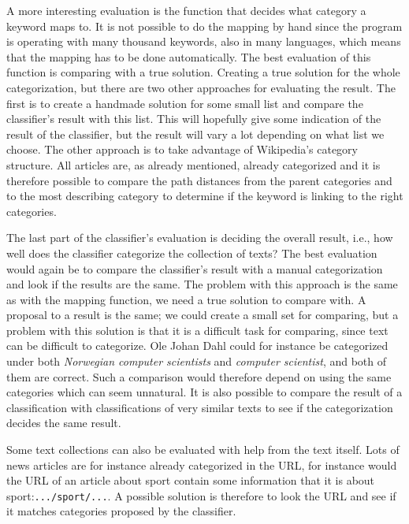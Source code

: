 \documentclass[english,a4paper]{ifimaster}
\begin{document}
A more interesting evaluation is the function that decides what category a keyword maps to. It is not possible to do the mapping by hand since the program is operating with many thousand keywords, also in many languages, which means that the mapping has to be done automatically. The best evaluation of this function is comparing with  a true solution. Creating a true solution for the whole categorization, but there are two other approaches for evaluating the result. The first is to create a handmade solution for some small list and compare the classifier's result with this list. This will hopefully give some indication of the result of the classifier, but the result will vary a lot depending on what list we choose. 
The other approach is to take advantage of Wikipedia's category structure. 
%
All articles are, as already mentioned, already categorized and it is therefore possible to compare the path 
distances from the parent categories and to the most describing category to determine if the keyword is linking to the right categories.


The last part of the classifier's evaluation is deciding the overall result, i.e., how well does the classifier categorize the collection of texts? The best evaluation would again be to compare the classifier's result with a manual categorization and look if the results are the same. The problem with this approach is the same as with the mapping function, we need a true solution to compare with. A proposal to a result is the same; we could create a small set for comparing, but a problem with this solution is that it is a difficult task for comparing, since text can be difficult to categorize. Ole Johan Dahl could for instance be categorized under both \textit{Norwegian computer scientists} and \textit{computer scientist}, and both of them are correct. Such a comparison would therefore depend on using the same categories which can seem unnatural. It is also possible to compare the result of a classification with classifications of very similar texts to see if the categorization decides the same result. 

Some text collections can also be evaluated with help from the text itself. Lots of news articles are for instance already categorized in the URL, for instance would the URL of an article about sport contain  some information that it is about sport:\texttt{.../sport/...}. A possible solution is therefore to look the URL and see if it matches categories proposed by the classifier. 
\end{document}

